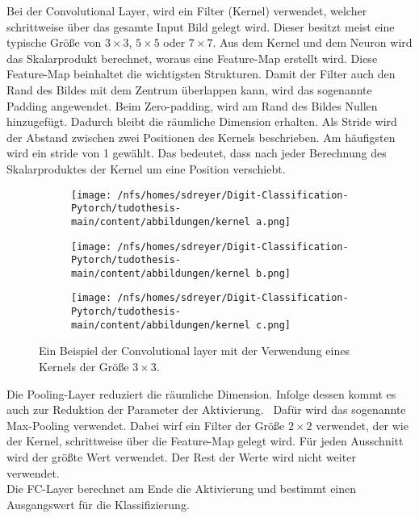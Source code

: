 Bei der Convolutional Layer, wird ein Filter (Kernel) verwendet, welcher schrittweise über das gesamte Input Bild gelegt wird.
Dieser besitzt meist eine typische Größe von $3 \times 3$, $5 \times 5$ oder $ 7 \times 7$.  
Aus dem Kernel und dem Neuron wird das Skalarprodukt berechnet, woraus eine Feature-Map erstellt wird. 
Diese Feature-Map beinhaltet die wichtigsten Strukturen.
Damit der Filter auch den Rand des Bildes mit dem Zentrum überlappen kann, wird das sogenannte Padding angewendet.
Beim Zero-padding, wird am Rand des Bildes Nullen hinzugefügt. Dadurch bleibt die räumliche Dimension erhalten.
Als Stride wird der Abstand zwischen zwei Positionen des Kernels beschrieben. Am häufigsten wird ein stride von 1 gewählt. 
Das bedeutet, dass nach jeder Berechnung des Skalarproduktes der Kernel um eine Position verschiebt.
\begin{figure}[htbp]
  \centering
  \begin{subfigure}[b]{0.3\textwidth}
    \texttt{[image: /nfs/homes/sdreyer/Digit-Classification-Pytorch/tudothesis-main/content/abbildungen/kernel a.png]}
    \label{}
  \end{subfigure}
  \hfill
  \begin{subfigure}[b]{0.3\textwidth}
    \texttt{[image: /nfs/homes/sdreyer/Digit-Classification-Pytorch/tudothesis-main/content/abbildungen/kernel b.png]}
    \label{}
  \end{subfigure}
  \hfill
  \begin{subfigure}[b]{0.3\textwidth}
    \texttt{[image: /nfs/homes/sdreyer/Digit-Classification-Pytorch/tudothesis-main/content/abbildungen/kernel c.png]}
    \label{}
  \end{subfigure}
  \caption{Ein Beispiel der Convolutional layer mit der Verwendung eines Kernels der Größe $3 \times 3$.~\cite{Yamashita2018}}
  \label{fig:kernel}
\end{figure}

Die Pooling-Layer reduziert die räumliche Dimension. Infolge dessen kommt es auch zur Reduktion der Parameter der Aktivierung.~\cite{datascience}
Dafür wird das sogenannte Max-Pooling verwendet. Dabei wirf ein Filter der Größe $2 \times 2$ verwendet, der wie der Kernel, schrittweise über die Feature-Map gelegt wird.
Für jeden Ausschnitt wird der größte Wert verwendet. Der Rest der Werte wird nicht weiter verwendet.~\cite{Yamashita2018}\\

Die FC-Layer berechnet am Ende die Aktivierung und bestimmt einen Ausgangswert für die Klassifizierung.


